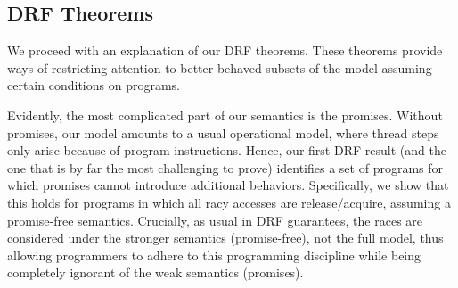 





\subsection{DRF Theorems}
\label{sec:drf}

We proceed with an explanation of our DRF theorems.
These theorems provide ways of restricting attention to better-behaved subsets
of the model assuming certain conditions on programs.

Evidently, the most complicated part of our semantics is the promises.
Without promises, our model amounts to a usual operational model,
where thread steps only arise because of program instructions.
Hence, our first DRF result (and the one that is by far the most challenging to prove)
identifies a set of programs for which promises cannot introduce additional behaviors.
Specifically, we show that this holds for programs in which all
racy accesses are release/acquire, %
assuming a promise-free semantics.
Crucially, as usual in DRF guarantees, the races are considered under the stronger
semantics (promise-free), not the full model, thus allowing programmers to adhere to this programming discipline
while being completely ignorant of the weak semantics (promises).

